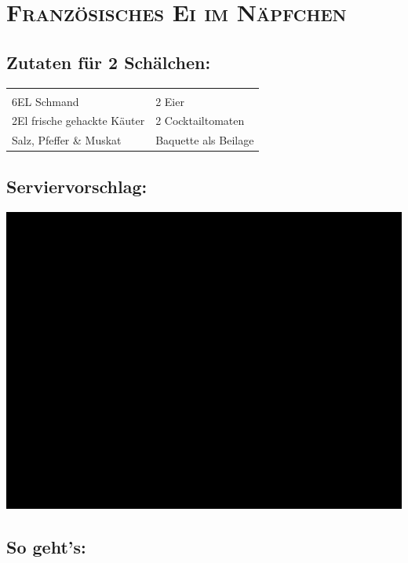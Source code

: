 \section{\textsc{Französisches Ei im Näpfchen}}

\subsection*{Zutaten für 2 Schälchen:}

\begin{tabular}{p{7.5cm} p{7.5cm}}
	& \\
	6EL Schmand & 2 Eier \\
	2El frische gehackte Käuter & 2 Cocktailtomaten \\
  Salz, Pfeffer \& Muskat & Baquette als Beilage
\end{tabular}

\subsection*{Serviervorschlag:}

\includegraphics[width=\textwidth]{img/ph.jpg} \cite{eiimnaepfchen}

\subsection*{So geht's:}

